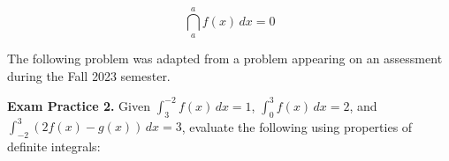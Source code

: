 \documentclass[10pt]{article}
\begin{document}
{
\[\dint_a^a f(x)\,dx = 0\]
}

The following problem was adapted from a problem appearing on an assessment during the Fall 2023 semester.

{\bf\color{blue}Exam Practice 2.} Given $\displaystyle \int_{3}^{-2} f(x)\,dx=1$, $\displaystyle \int_{0}^3 f(x)\,dx = 2$, and $\displaystyle\int_{-2}^3 \left(2f(x)-g(x)\right)\,dx=3$, evaluate the following using properties of definite integrals: 
\end{document}
